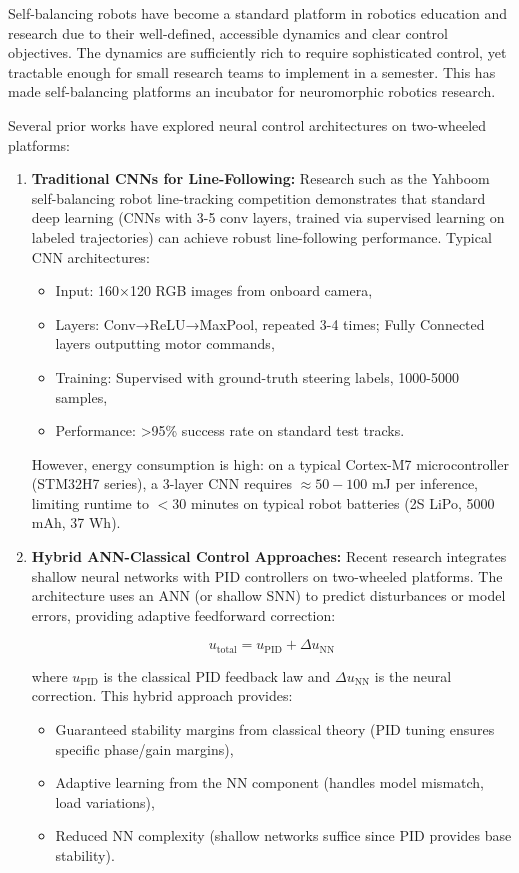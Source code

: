 Self-balancing robots have become a standard platform in robotics education and research due to their 
well-defined, accessible dynamics and clear control objectives. The dynamics are sufficiently rich to 
require sophisticated control, yet tractable enough for small research teams to implement in a semester. 
This has made self-balancing platforms an incubator for neuromorphic robotics research.

Several prior works have explored neural control architectures on two-wheeled platforms:

\begin{enumerate}
    
\item \textbf{Traditional CNNs for Line-Following:}
Research such as the Yahboom self-balancing robot line-tracking competition \cite{yahboom2021} demonstrates 
that standard deep learning (CNNs with 3-5 conv layers, trained via supervised learning on labeled trajectories) 
can achieve robust line-following performance. Typical CNN architectures:
    \begin{itemize}
        \item Input: 160×120 RGB images from onboard camera,
        \item Layers: Conv→ReLU→MaxPool, repeated 3-4 times; Fully Connected layers outputting motor commands,
        \item Training: Supervised with ground-truth steering labels, 1000-5000 samples,
        \item Performance: >95\% success rate on standard test tracks.
    \end{itemize}
    
However, energy consumption is high: on a typical Cortex-M7 microcontroller (STM32H7 series), a 3-layer CNN 
requires $\approx 50-100$ mJ per inference, limiting runtime to $<30$ minutes on typical robot batteries 
(2S LiPo, 5000 mAh, 37 Wh).

    
\item \textbf{Hybrid ANN-Classical Control Approaches:}
Recent research \cite{tan2021neuromorphic} integrates shallow neural networks with PID controllers on two-wheeled 
platforms. The architecture uses an ANN (or shallow SNN) to predict disturbances or model errors, providing 
adaptive feedforward correction:

$$u_{\text{total}} = u_{\text{PID}} + \Delta u_{\text{NN}}$$

where $u_{\text{PID}}$ is the classical PID feedback law and $\Delta u_{\text{NN}}$ is the neural correction. 
This hybrid approach provides:
    \begin{itemize}
        \item Guaranteed stability margins from classical theory (PID tuning ensures specific phase/gain margins),
        \item Adaptive learning from the NN component (handles model mismatch, load variations),
        \item Reduced NN complexity (shallow networks suffice since PID provides base stability).
    \end{itemize}


\end{enumerate}
